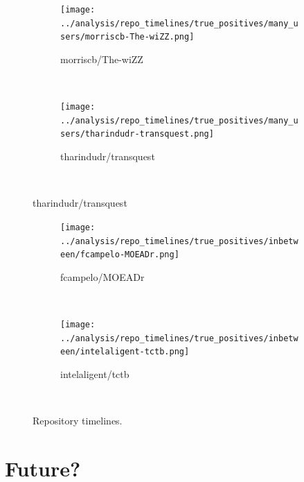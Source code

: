 \documentclass[10pt,a4paper]{scrartcl}
\begin{document}
\begin{figure}[h]\ContinuedFloat
    \centering
    \begin{subfigure}[t]{0.8\textwidth}
        \centering
        \texttt{[image: ../analysis/repo\_timelines/true\_positives/many\_users/morriscb-The-wiZZ.png]}
        \caption{morriscb/The-wiZZ}
    \end{subfigure}\\
    \begin{subfigure}[t]{0.8\textwidth}
        \centering
        \texttt{[image: ../analysis/repo\_timelines/true\_positives/many\_users/tharindudr-transquest.png]}
        \caption{tharindudr/transquest}
    \end{subfigure}\\
\end{figure}
\begin{figure}[h]\ContinuedFloat
    \centering
    \begin{subfigure}[t]{0.8\textwidth}
        \centering
        \texttt{[image: ../analysis/repo\_timelines/true\_positives/inbetween/fcampelo-MOEADr.png]}
        \caption{fcampelo/MOEADr}
    \end{subfigure}\\
    \begin{subfigure}[t]{0.8\textwidth}
        \centering
        \texttt{[image: ../analysis/repo\_timelines/true\_positives/inbetween/intelaligent-tctb.png]}
        \caption{intelaligent/tctb}
    \end{subfigure}\\
    \caption{Repository timelines.}
    \label{fig:repo_timelines}
\end{figure}

\section{Future?}
\end{document}
